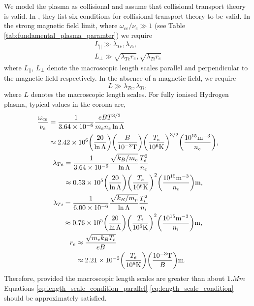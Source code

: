 We model the plasma as collisional and assume that collisional transport theory is valid. In \citet{Richardson2019}, they list six conditions for collisional transport theory to be valid. In the strong magnetic field limit, where $\omega_{ce}/\nu_e \gg 1$ (see Table \ref{tab:fundamental_plasma_paramter}) we require
\begin{gather}
    \label{eq:length_scale_condition_parallel}
    L_{||} \gg \lambda_{Te}, \lambda_{Ti}, \\
    \label{eq:length_scale_condition_perpendicular}
    L_\perp \gg \sqrt{\lambda_{Te} r_e}, \sqrt{\lambda_{Ti} r_e}
\end{gather}
where $L_{||}$, $L_\perp$ denote the macroscopic length scales parallel and perpendicular to the magnetic field respectively. In the absence of a magnetic field, we require
\begin{equation}
    \label{eq:length_scale_condition}
    L \gg \lambda_{Te}, \lambda_{Ti},
\end{equation}
where $L$ denotes the macroscopic length scales. For fully ionised Hydrogen plasma, typical values in the corona are,
\begin{gather}
    \begin{aligned}
    \frac{\omega_{ce}}{\nu_e} &= \frac{1}{3.64\times10^{-6}}\frac{eBT^{3/2}}{m_en_e\ln\Lambda} \\
    &\approx 2.42\times10^6\qty(\frac{20}{\ln\Lambda})\qty(\frac{B}{10^{-3}\si{.T}})\qty(\frac{T_e}{10^6\si{.K}})^{3/2}\qty(\frac{10^{15}\si{.m^{-3}}}{n_e}),
    \end{aligned} \\
    \begin{aligned}
    \lambda_{Te} &= \frac{1}{3.64\times10^{-6}}\frac{\sqrt{k_B/m_e}}{\ln\Lambda}\frac{T_e^2}{n_e} \\
    &\approx 0.53\times10^5\qty(\frac{20}{\ln\Lambda})\qty(\frac{T_e}{10^6\si{.K}})^2\qty(\frac{10^{15}\si{.m^{-3}}}{n_e})\si{.m}, 
    \end{aligned} \\
    \begin{aligned}
    \lambda_{Ti} &= \frac{1}{6.00\times10^{-6}}\frac{\sqrt{k_B/m_p}}{\ln\Lambda}\frac{T_i^2}{n_i} \\
    &\approx 0.76\times10^5\qty(\frac{20}{\ln\Lambda})\qty(\frac{T_i}{10^6\si{.K}})^2\qty(\frac{10^{15}\si{.m^{-3}}}{n_i})\si{.m}, 
    \end{aligned} \\
    \begin{aligned}
    r_e & \approx \frac{\sqrt{m_e k_B T_e}}{eB} \\
    &\approx 2.21 \times 10^{-2}\qty(\frac{T_e}{10^6\si{.K}})\qty(\frac{10^{-3}\si{.T}}{B})\si{.m}.
    \end{aligned}
\end{gather}
Therefore, provided the macroscopic length scales are greater than about $1\si{.Mm}$ Equations \eqref{eq:length_scale_condition_parallel}-\eqref{eq:length_scale_condition} should be approximately satisfied.

